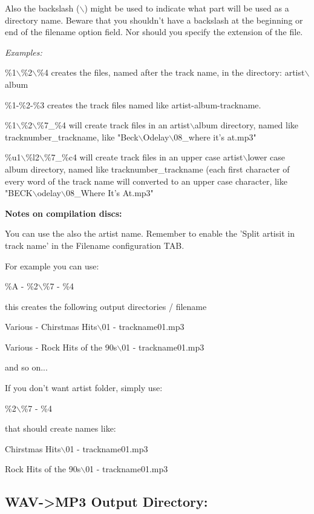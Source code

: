 Also the backslash ($\backslash$) might be used to indicate what part will be
used as a directory name. Beware that you shouldn't have a backslash at
the beginning or end of the filename option field. Nor should you specify the
extension of the file.

{\it Examples:}

\%1$\backslash$\%2$\backslash$\%4 creates the files, named after the track name,
in the directory: artist$\backslash$album

\%1-\%2-\%3 creates the track files named like artist-album-trackname.

\%1$\backslash$\%2$\backslash$\%7_\%4 will create track files in
an artist$\backslash$album directory, named like tracknumber_trackname,
like "Beck$\backslash$Odelay$\backslash$08_where it's at.mp3"

\%u1$\backslash$\%l2$\backslash$\%7_\%c4 will create track files in
an upper case artist$\backslash$lower case album directory, named like tracknumber_trackname (each
first character of every word of the track name will converted to an upper case character, like "BECK$\backslash$odelay$\backslash$08_Where It's At.mp3"

{\bf Notes on compilation discs:}

You can use the %
also the artist name. Remember to enable the 'Split artisit in track name' in the Filename configuration TAB.

For example you can use:


\%A - \%2$\backslash$\%7 - \%4


this creates the following output directories / filename


Various - Chirstmas Hits$\backslash$01 - trackname01.mp3


Various - Rock Hits of the 90s$\backslash$01 - trackname01.mp3


and so on...


If you don't want artist folder, simply use:


\%2$\backslash$\%7 - \%4


that should create names like: 


Chirstmas Hits$\backslash$01 - trackname01.mp3


Rock Hits of the 90s$\backslash$01 - trackname01.mp3



\subsection{WAV->MP3 Output Directory:}

